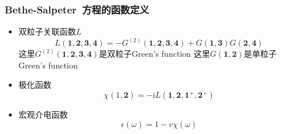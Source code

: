 \documentclass[cjk,slidestop,compress,mathserif,blue]{beamer}
\begin{document}
\frame
{
	\frametitle{\textrm{Bethe-Salpeter~}方程的函数定义}
\begin{itemize}
	\item 双粒子关联函数$L$
		\begin{displaymath}
			L(\mathbf{1},\mathbf{2},\mathbf{3},\mathbf{4})=-G^{(2)}(\mathbf{1},\mathbf{2},\mathbf{3},\mathbf{4})+G(\mathbf{1},\mathbf{3})G(\mathbf{2},\mathbf{4})
		\end{displaymath}
		这里$G^{(2)}(\mathbf{1},\mathbf{2},\mathbf{3},\mathbf{4})$是双粒子\textrm{Green's function}
		\vskip 5pt
		这里$G(\mathbf{1},\mathbf{2})$是单粒子\textrm{Green's function}

	\item 极化函数
		\begin{displaymath}
			\chi(\mathrm{1},\mathbf{2})=-\mathrm{i}L(\mathbf{1},\mathbf{2},\mathbf{1}^+,\mathbf{2}^+)
		\end{displaymath}
	\item 宏观介电函数
		\begin{displaymath}
			\epsilon(\omega)=1-v\chi(\omega)
		\end{displaymath}
\end{itemize}
}
\end{document}
